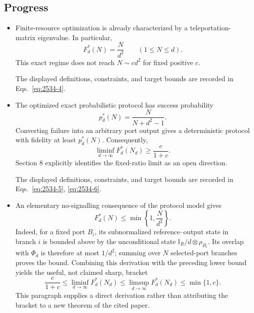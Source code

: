 \subsection*{Progress}

\begin{itemize}
  \item Finite-resource optimization is already characterized by a teleportation-matrix eigenvalue. In particular,
  \begin{equation}
F_d^*(N)=\frac{N}{d^2}\qquad(1\leq N\leq d).
\label{eq:2534-4}
\end{equation}
  This exact regime does not reach $N\sim c d^2$ for fixed positive $c$. 

The displayed definitions, constraints, and target bounds are recorded in Eqs.~\eqref{eq:2534-4}.

  \item The optimized exact probabilistic protocol has success probability
  \begin{equation}
p_d^*(N)=\frac{N}{N+d^2-1}.
\label{eq:2534-5}
\end{equation}
  Converting failure into an arbitrary port output gives a deterministic protocol with fidelity at least $p_d^*(N)$. Consequently,
  \begin{equation}
\liminf_{d\to\infty}F_d^*(N_d)\geq\frac{c}{1+c}.
\label{eq:2534-6}
\end{equation}
  Section 8 explicitly identifies the fixed-ratio limit as an open direction. 

The displayed definitions, constraints, and target bounds are recorded in Eqs.~\eqref{eq:2534-5}, \eqref{eq:2534-6}.

  \item An elementary no-signalling consequence of the protocol model gives
  \begin{equation}
F_d^*(N)\leq\min\left\{1,\frac{N}{d^2}\right\}.
\label{eq:2534-7}
\end{equation}
  Indeed, for a fixed port $B_i$, its subnormalized reference–output state in branch $i$ is bounded above by the unconditional state $\mathbb I_R/d\otimes\rho_{B_i}$. Its overlap with $\Phi_d$ is therefore at most $1/d^2$; summing over $N$ selected-port branches proves the bound. Combining this derivation with the preceding lower bound yields the useful, not claimed sharp, bracket
  \begin{equation}
\frac{c}{1+c}
  \leq\liminf_{d\to\infty}F_d^*(N_d)
  \leq\limsup_{d\to\infty}F_d^*(N_d)
  \leq\min\{1,c\}.
\label{eq:2534-8}
\end{equation}
  This paragraph supplies a direct derivation rather than attributing the bracket to a new theorem of the cited paper. 


\end{itemize}
